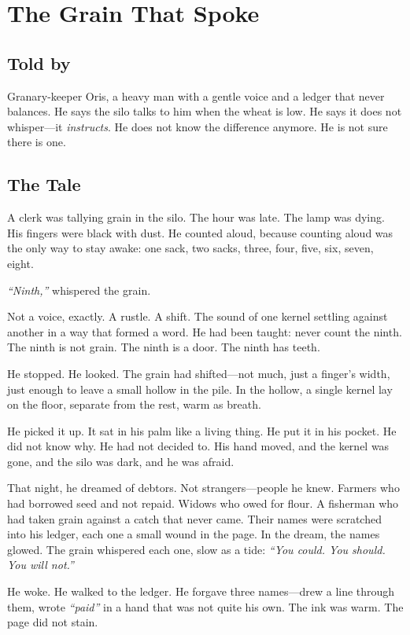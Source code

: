 \chapter{The Grain That Spoke}

\section*{Told by}
Granary-keeper Oris, a heavy man with a gentle voice and a ledger that never balances. He says the silo talks to him when the wheat is low. He says it does not whisper---it \textit{instructs}. He does not know the difference anymore. He is not sure there is one.

\section*{The Tale}

A clerk was tallying grain in the silo. The hour was late. The lamp was dying. His fingers were black with dust. He counted aloud, because counting aloud was the only way to stay awake: one sack, two sacks, three, four, five, six, seven, eight.

\textit{``Ninth,''}{} whispered the grain.

Not a voice, exactly. A rustle. A shift. The sound of one kernel settling against another in a way that formed a word. He had been taught: never count the ninth. The ninth is not grain. The ninth is a door. The ninth has teeth.

He stopped. He looked. The grain had shifted---not much, just a finger's width, just enough to leave a small hollow in the pile. In the hollow, a single kernel lay on the floor, separate from the rest, warm as breath.

He picked it up. It sat in his palm like a living thing. He put it in his pocket. He did not know why. He had not decided to. His hand moved, and the kernel was gone, and the silo was dark, and he was afraid.

That night, he dreamed of debtors. Not strangers---people he knew. Farmers who had borrowed seed and not repaid. Widows who owed for flour. A fisherman who had taken grain against a catch that never came. Their names were scratched into his ledger, each one a small wound in the page. In the dream, the names glowed. The grain whispered each one, slow as a tide: \textit{``You could. You should. You will not.''}

He woke. He walked to the ledger. He forgave three names---drew a line through them, wrote \textit{``paid''}{} in a hand that was not quite his own. The ink was warm. The page did not stain.

